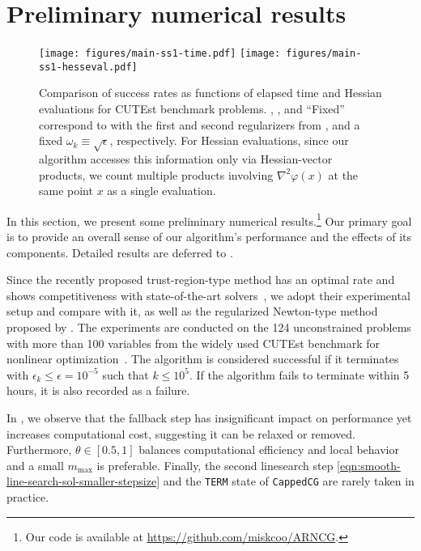 \section{Preliminary numerical results} 
\label{sec:main/numerical}

\begin{figure}[tbp]
    \centering
    \texttt{[image: figures/main-ss1-time.pdf]} \hfill
    \texttt{[image: figures/main-ss1-hesseval.pdf]}
    \caption{
        Comparison of success rates as functions of elapsed time and Hessian evaluations for CUTEst benchmark problems.  
        , , and ``Fixed'' correspond to  with the first and second regularizers from , and a fixed $\omega_k \equiv \sqrt{\epsilon}$, respectively.  
        For Hessian evaluations, 
        since our algorithm accesses this information only via Hessian-vector products, 
        we count multiple products involving $\nabla^2\varphi(x)$ at the same point $x$ as a single evaluation.
        }
    \label{fig:main-algoperf}
\end{figure}

In this section, we present some preliminary numerical results.\footnote{Our code is available at \url{https://github.com/miskcoo/ARNCG}.} %
Our primary goal is to provide an overall sense of our algorithm's performance and the effects of its components.
Detailed results are deferred to .

Since the recently proposed trust-region-type method  has an optimal rate and shows competitiveness with state-of-the-art solvers~\citep{hamad2024simple}, we adopt their experimental setup and compare with it, as well as the regularized Newton-type method  proposed by \citet{gratton2024yet}.
The experiments are conducted on the 124 unconstrained problems with more than 100 variables from the widely used CUTEst benchmark for nonlinear optimization~\citep{gould2015cutest}.
The algorithm is considered successful if it terminates with $\epsilon_k \leq \epsilon = 10^{-5}$ such that $k \leq 10^5$. If the algorithm fails to terminate within 5 hours, it is also recorded as a failure.

In , 
we observe that the fallback step has insignificant impact on  performance yet increases computational cost, suggesting it can be relaxed or removed.
Furthermore, $\theta \in [0.5, 1]$ balances computational efficiency and local behavior 
and a small $m_{\mathrm{max}}$ is preferable. 
Finally, the second linesearch step \eqref{eqn:smooth-line-search-sol-smaller-stepsize} and the \texttt{TERM} state of \texttt{CappedCG} are rarely taken in practice.

